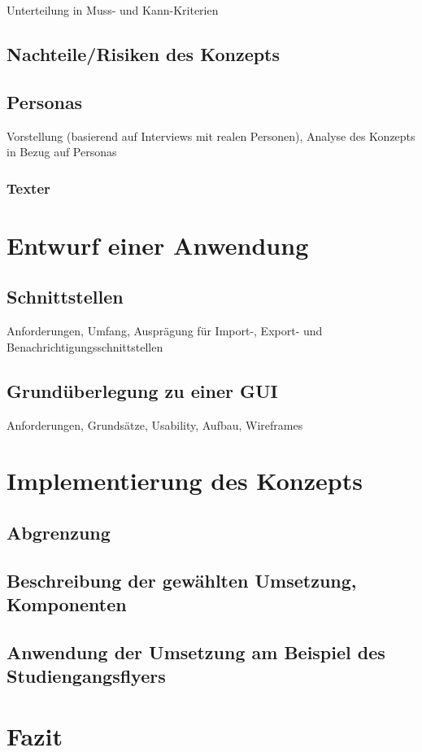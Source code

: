 \documentclass[11pt,a4paper]{article}
\begin{document}
Unterteilung in Muss- und Kann-Kriterien

\subsection{Nachteile/Risiken des Konzepts}

\subsection{Personas}

Vorstellung (basierend auf Interviews mit realen Personen), Analyse des Konzepts in Bezug auf Personas

\subsubsection{Texter}

\section{Entwurf einer Anwendung}

\subsection{Schnittstellen}

Anforderungen, Umfang, Ausprägung für Import-, Export- und Benachrichtigungsschnittstellen

\subsection{Grundüberlegung zu einer GUI}

Anforderungen, Grundsätze, Usability, Aufbau, Wireframes

\section{Implementierung des Konzepts}

\subsection{Abgrenzung}
\subsection{Beschreibung der gewählten Umsetzung, Komponenten}

\subsection{Anwendung der Umsetzung am Beispiel des Studiengangsflyers}

\section{Fazit}

\pagebreak


\end{document}
